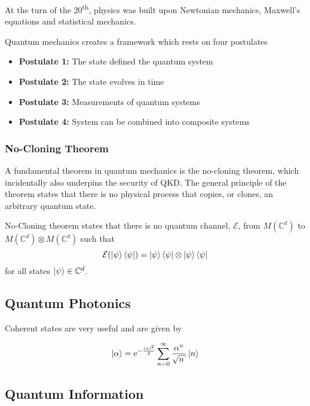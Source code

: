 At the turn of the 20\textsuperscript{th}, physics was built upon Newtonian mechanics, Maxwell's equations and statistical mechanics. 

Quantum mechanics creates a framework which rests on four postulates

\begin{itemize}
	\item[] \textbf{Postulate 1:} The state defined the quantum system
	\item[] \textbf{Postulate 2:} The state evolves in time
	\item[] \textbf{Postulate 3:} Measurements of quantum systems
	\item[] \textbf{Postulate 4:} System can be combined into composite systems
\end{itemize}

\subsubsection{No-Cloning Theorem}

A fundamental theorem in quantum mechanics is the {\color{bristol-red} no-cloning theorem}, which incidentally also underpins the security of \ac{QKD}. The general principle of the theorem states that there is no physical process that copies, or clones, an arbitrary quantum state.

\begin{theo}
	 No-Cloning theorem states that there is no quantum channel, $\mathcal{E}$, from $M(\mathbb{C}^d)$ to $M(\mathbb{C}^d) \otimes M(\mathbb{C}^d)$ such that
	 \begin{equation*}
	 	\mathcal{E}(\ket{\psi}\bra{\psi}) = \ket{\psi}\bra{\psi} \otimes \ket{\psi}\bra{\psi}
	 \end{equation*}
	 for all states $\ket{\psi} \in \mathbb{C}^d$.
\end{theo}


\subsection{Quantum Photonics}



Coherent states are very useful and are given by

\begin{equation}
	\ket{\alpha} = \mathrm{e}^{-\frac{|\alpha|^2}{2}} \sum_{n=0}^\infty \frac{\alpha^n}{\sqrt{n}} \ket{n} 
\end{equation}


\subsection{Quantum Information}



